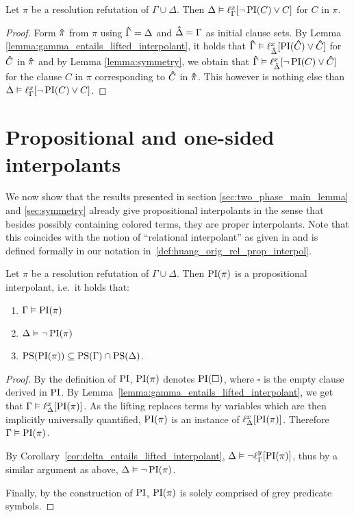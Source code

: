 \begin{corr}
	\label{cor:delta_entails_lifted_interpolant}
	Let $\pi$ be a resolution refutation of $\Gamma \cup \Delta$. 
	Then $\Delta \vDash \ell_{\Gamma}^{x}[ \lnot \operatorname{PI}(C) \lor C ]$ for $C$ in $\pi$.
\end{corr}
\begin{proof}
	Form $\bm\hat{\pi}$ from $\pi$ using $\bm\hat{\Gamma} = \Delta$ and $\bm\hat{\Delta} = \Gamma$ as initial clause sets.
	By Lemma \ref{lemma:gamma_entails_lifted_interpolant}, it holds that $\bm\hat{\Gamma} \vDash \ell_{\bm\hat{\Delta}}^{x}[ \operatorname{PI}(\bm\hat{C}) \lor \bm\hat{C} ]$ for $\bm\hat{C}$ in $\bm\hat{\pi}$ and 
	by Lemma \ref{lemma:symmetry}, we obtain that 
	$\bm\hat{\Gamma} \vDash \ell_{\bm\hat{\Delta}}^{x}[ \lnot \operatorname{PI}(C) \lor \bm\hat{C} ]$ for the clause $C$ in $\pi$ corresponding to $\bm\hat{C}$ in $\bm\hat{\pi}$. 
	This however is nothing else than 
	$\Delta \entails\nolinebreak \lft{\Gamma}{x}{ \lnot \PI(C) \lor C }$.
\end{proof}


\section{Propositional and one-sided interpolants}

We now show that the results presented in section \ref{sec:two_phase_main_lemma} and \ref{sec:symmetry}
already give propositional interpolants in the sense that besides possibly containing colored terms, they are proper interpolants.
Note that this coincides with the notion of ``relational interpolant'' as given in \cite{Huang95} and is defined formally in our notation in~\ref{def:huang_orig_rel_prop_interpol}.

\begin{corr}
	\label{cor:propositional_interpolant}
	Let $\pi$ be a resolution refutation of $\Gamma \cup \Delta$.
	Then $\operatorname{PI}(\pi)$ is a propositional interpolant, i.e.\ it holds that:
	\begin{enumerate}
		\item$\Gamma\vDash \operatorname{PI}(\pi)$
		\item$\Delta\vDash \lnot \operatorname{PI}(\pi)$
		\item $\operatorname{PS}(\operatorname{PI}(\pi)) \subseteq \operatorname{PS}(\Gamma) \cap \operatorname{PS}(\Delta)$.
	\end{enumerate}
\end{corr}
\begin{proof}
	By the definition of $\operatorname{PI}$, 
	$\operatorname{PI}(\pi)$ denotes $\operatorname{PI}(\square)$, where $\square$ is the empty clause derived in $\operatorname{PI}$.
	By Lemma~\ref{lemma:gamma_entails_lifted_interpolant}, we get that 
	$ \Gamma \vDash \ell_{\Delta}^{x}[\operatorname{PI}(\pi)]$.
	As the lifting replaces terms by variables which are then implicitly universally quantified, $\operatorname{PI}(\pi)$ is an instance of $\ell_{\Delta}^{x}[\operatorname{PI}(\pi)]$.
	Therefore $\Gamma \vDash \operatorname{PI}(\pi)$.

	By Corollary~\ref{cor:delta_entails_lifted_interpolant}, $\Delta \vDash \lnot \ell_{\Gamma}^{y}[\operatorname{PI}(\pi)]$,
	thus by a similar argument as above, $\Delta \vDash \lnot \operatorname{PI}(\pi)$.


	Finally, by the construction of $\operatorname{PI}$, $\operatorname{PI}(\pi)$ is solely comprised of grey predicate symbols.
\end{proof}


